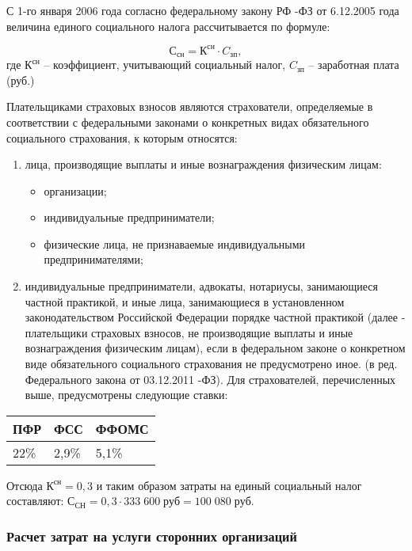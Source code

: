 С 1-го января 2006 года согласно федеральному закону РФ -ФЗ от 6.12.2005 года величина единого социального налога рассчитывается по формуле:

$$ С_{сн}=К^{сн} \cdot C_{зп},$$
где $К^{сн}$ – коэффициент, учитывающий социальный налог, $C_{зп}$ – заработная плата (руб.)

Плательщиками страховых взносов являются страхователи, определяемые в соответствии с федеральными законами о конкретных видах обязательного социального страхования, к которым относятся:
\begin{enumerate}
\item лица, производящие выплаты и иные вознаграждения физическим лицам: 
\begin{itemize}
\item организации;
\item индивидуальные предприниматели;
\item физические лица, не признаваемые индивидуальными предпринимателями;
\end{itemize}
\item индивидуальные предприниматели, адвокаты, нотариусы, занимающиеся частной практикой, и иные лица, занимающиеся в установленном законодательством Российской Федерации порядке частной практикой (далее - плательщики страховых взносов, не производящие выплаты и иные вознаграждения физическим лицам), если в федеральном законе о конкретном виде обязательного социального страхования не предусмотрено иное.
(в ред. Федерального закона от 03.12.2011 -ФЗ).
Для страхователей, перечисленных выше, предусмотрены следующие ставки:
\end{enumerate}
\begin{table}[htb]
    \centering
        \begin{tabular}{|l|l|l|}
        		\hline
        		ПФР & ФСС & ФФОМС \\
        		\hline
        		22\% & 2,9\% & 5,1\% \\
        		\hline
        \end{tabular}   		
\end{table}

Отсюда  $К^{сн} = 0,3$  и таким образом затраты на единый социальный налог составляют: $С_{СН} = 0,3  \cdot 333 \; 600  \; руб = 100 \; 080 \; руб.$

\subsubsection{Расчет затрат на услуги сторонних организаций} 

